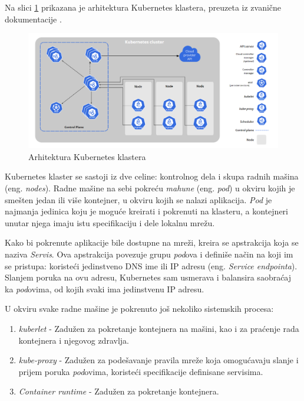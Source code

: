 \documentclass[12pt,oneside]{memoir}
\begin{document}
Na slici \ref{fig:kubernetesarh} prikazana je arhitektura Kubernetes klastera, preuzeta iz zvanične dokumentacije \cite{KubernetesArchitecture}.

\begin{figure}[!ht]
  \centering
  \label{fig:kubernetesarh}
  \includegraphics[width=1.0\textwidth]{./images/kubernetes_architecture.png}
  \caption{Arhitektura Kubernetes klastera}
\end{figure}

Kubernetes klaster se sastoji iz dve celine: kontrolnog dela i skupa radnih mašina (eng. \emph{nodes}). Radne mašine na sebi pokreću \emph{mahune} (eng. \emph{pod}) u okviru kojih je smešten jedan ili više kontejner, u okviru kojih se nalazi aplikacija. \emph{Pod} je najmanja jedinica koju je moguće kreirati i pokrenuti na klasteru, a kontejneri unutar njega imaju istu specifikaciju i dele lokalnu mrežu.

Kako bi pokrenute aplikacije bile dostupne na mreži, kreira se apstrakcija koja se naziva \emph{Servis}. Ova apstrakcija povezuje grupu \emph{pod}ova i definiše način na koji im se pristupa: koristeći jedinstveno DNS ime ili IP adresu (eng. \emph{Service endpointa}). Slanjem poruka na ovu adresu, Kubernetes sam usmerava i balansira saobraćaj ka \emph{pod}ovima, od kojih svaki ima jedinstvenu IP adresu.

U okviru svake radne mašine je pokrenuto još nekoliko sistemskih procesa: 
\begin{enumerate}
\item \emph{kuberlet} - Zadužen za pokretanje kontejnera na mašini, kao i za praćenje rada kontejnera i njegovog zdravlja.
\item \emph{kube-proxy} - Zadužen za podešavanje pravila mreže koja omogućavaju slanje i prijem poruka \emph{pod}ovima, koristeći specifikacije definisane servisima.
\item \emph{Container runtime} - Zadužen za pokretanje kontejnera.
\end{enumerate}
\end{document}
